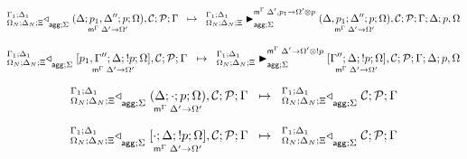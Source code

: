 
\[
\trans{
   \contstatea{\Delta_N}{\lframe{\Delta}{p_1, \Delta''}{p}{\Omega}{\Delta'}{\Omega'}, \lstack{C} ; \lstack{P}}{\Gamma}{\Sigma}
}
{
   \matstatea{\Delta_N}{\lframe{\Delta,
      p_1}{\Delta''}{p}{\Omega}{\Delta'}{\Omega'}, \lstack{C}; \lstack{P}}{\Gamma}{\Delta}{p,
      \Omega}{\Delta', p_1 \rightarrow \Omega' \otimes p}{\Sigma}
}
\]

\[
\trans{
   \contstatea{\Delta_N}{\pframe{p_1, \Gamma''}{\Delta}{\bang
   p}{\Omega}{\Delta'}{\Omega'}, \lstack{C} ; \lstack{P}}{\Gamma}{\Sigma}
}
{
   \matstatea{\Delta_N}{\pframe{\Gamma''}{\Delta}{\bang p}
      {\Omega}{\Delta'}{\Omega'}, \lstack{C}; \lstack{P}}{\Gamma}{\Delta}{p,
      \Omega}{\Delta' \rightarrow \Omega' \otimes \bang p}{\Sigma}
}
\]

\[
\trans{
   \contstatea{\Delta_N}{\lframe{\Delta}{\cdot}{p}{\Omega}{\Delta'}{\Omega'}, \lstack{C} ; \lstack{P}}{\Gamma}{\Sigma}
}
{
   \contstatea{\Delta_N}{\lstack{C} ; \lstack{P}}{\Gamma}{\Sigma}
}
\]

\[
\trans{
   \contstatea{\Delta_N}{\pframe{\cdot}{\Delta}{\bang
   p}{\Omega}{\Delta'}{\Omega'}, \lstack{C} ; \lstack{P}}{\Gamma}{\Sigma}
}
{
   \contstatea{\Delta_N}{\lstack{C} ; \lstack{P}}{\Gamma}{\Sigma}
}
\]
